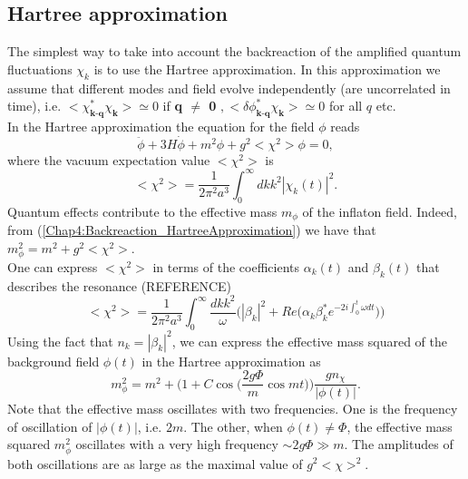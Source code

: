 \documentclass[11pt,a4paper,twoside]{book}
\begin{document}
\subsection{Hartree approximation}
The simplest way to take into account the backreaction of the amplified quantum 
fluctuations $ \chi_{k} $ is to use the Hartree approximation.
In this approximation we assume that different modes and field evolve independently (are uncorrelated in time), i.e. $ <\chi^{*}_\textbf{k-q}\chi_{\textbf{k}}> \simeq 0 $ if \textbf{q $\neq$ 0} $, <\delta \phi^{*}_\textbf{k-q}\chi_{\textbf{k}}> \simeq 0 $ for all $ q $ etc.\\
In the Hartree approximation the equation for the field $\phi$ reads
\begin{equation}
\label{Chap4:Backreaction_HartreeApproximation}
\ddot{\phi} + 3H\dot{\phi} + m^{2}\phi + g^{2}<\chi^{2}>\phi=0,
\end{equation}
where the vacuum expectation value $ <\chi^{2}> $ is
\begin{equation}
\label{Chap4:Backreaction_vevChi2}
<\chi^{2}>=\frac{1}{2\pi^{2}a^{3}}\int_{0}^{\infty} dk k^{2}|\chi_{k}(t)|^{2}.
\end{equation}
Quantum effects contribute to the effective mass $ m_{\phi} $ of the inflaton field. Indeed, from (\ref{Chap4:Backreaction_HartreeApproximation}) we have that $ m_{\phi}^{2}=m^{2} + g^{2}<\chi^{2}> $. \\
One can express $ <\chi^{2}> $ in terms of the coefficients $ \alpha_{k}(t) $ and $\beta_{k}(t)$ that describes the resonance (REFERENCE)
\begin{equation}
\label{Chap4:Backreaction_ExpressionFluctuation}
<\chi^{2}> = \frac{1}{2\pi^{2}a^{3}}\int_{0}^{\infty} \frac{dk k^{2}}{\omega} \Bigg(|\beta_{k}|^{2} + Re\Bigg(\alpha_{k}\beta_{k}^{*}e^{-2i\int_{0}^{t} \omega dt}\Bigg)\Bigg)
\end{equation}
Using the fact that $ n_{k}=|\beta_{k}|^{2} $, we can express the effective mass squared  of the background field $\phi(t)$ in the Hartree approximation as
\begin{equation}
\label{Chap4:Backreaction_EffectiveMass}
m^{2}_{\phi}=m^{2} + \Bigg(1 + C\cos\Bigg( \frac{2g\Phi}{m} \cos mt \Bigg) \Bigg) \frac{gn_{\chi}}{|\phi(t)|}.
\end{equation}
Note that the effective mass oscillates with two frequencies. One is the frequency of oscillation of $ |\phi(t)|$,  i.e. $ 2m $. The other, when $ \phi(t) \neq \Phi $, the effective mass squared $ m^{2}_{\phi} $ oscillates with a very high frequency $\sim 2g\Phi \gg m$. The amplitudes of both oscillations are as large as the maximal value of $ g^{2}<\chi>^{2} $. \\
\end{document}
